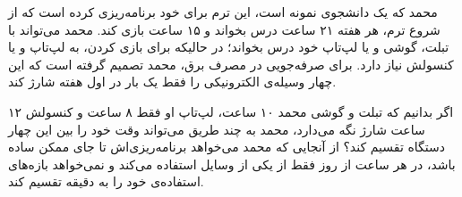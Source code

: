     \p
    محمد که یک دانشجوی نمونه است، این ترم برای خود برنامه‌ریزی کرده است که از شروع ترم، هر هفته ۲۱ ساعت درس بخواند و ۱۵ ساعت بازی کند. محمد می‌تواند با تبلت، گوشی و یا لپ‌تاپ خود درس بخواند؛ در حالیکه برای بازی کردن، به لپ‌تاپ و یا کنسولش نیاز دارد. برای صرفه‌جویی در مصرف برق، محمد تصمیم گرفته است که این چهار وسیله‌ی الکترونیکی را فقط یک بار در اول هفته شارژ کند.
    
    \p
    اگر بدانیم که تبلت و گوشی محمد ۱۰ ساعت، لپ‌تاپ او فقط ۸ ساعت و کنسولش ۱۲ ساعت شارژ نگه می‌دارد، محمد به چند طریق می‌تواند وقت خود را بین این چهار دستگاه تقسیم کند؟ از آنجایی که محمد می‌خواهد برنامه‌ریزی‌اش تا جای
ممکن ساده باشد، در هر ساعت از روز فقط از یکی از وسایل استفاده می‌کند و نمی‌خواهد بازه‌های استفاده‌ی خود را به دقیقه تقسیم کند.
